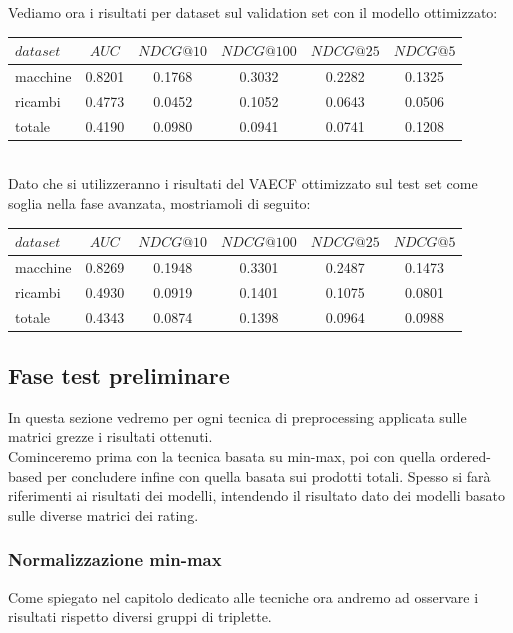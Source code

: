 Vediamo ora i risultati per dataset sul validation set con il modello ottimizzato:\\

\begin{tabular}{|l|c|cccc|}
    \toprule
    $dataset$ &    $AUC$ &  $NDCG@10$ & $NDCG@100$  & $NDCG@25$ & $NDCG@5$  \\
    \midrule
    macchine & 0.8201 & 0.1768 & 0.3032 & 0.2282 & 0.1325 \\
    ricambi & 0.4773 & 0.0452 & 0.1052 & 0.0643 & 0.0506 \\
    totale  & 0.4190 & 0.0980 & 0.0941 & 0.0741 & 0.1208 \\
\bottomrule
\end{tabular}\\

Dato che si utilizzeranno i risultati del VAECF ottimizzato sul test set come soglia nella fase avanzata, mostriamoli di seguito:\\

\begin{tabular}{|l|c|cccc|}
    \toprule
    $dataset$ &    $AUC$ &  $NDCG@10$ & $NDCG@100$  & $NDCG@25$ & $NDCG@5$  \\
    \midrule
    macchine & 0.8269 &  0.1948 &   0.3301 &  0.2487 & 0.1473 \\
    ricambi  & 0.4930 &  0.0919 &   0.1401 &  0.1075 & 0.0801 \\
    totale  & 0.4343 &  0.0874 &   0.1398 &  0.0964 & 0.0988 \\

\bottomrule
\end{tabular}

\subsection{Fase test preliminare}
In questa sezione vedremo per ogni tecnica di preprocessing applicata sulle matrici grezze i risultati ottenuti.\\
Cominceremo prima con la tecnica basata su min-max, poi con quella ordered-based per concludere infine con quella basata sui prodotti totali. 
Spesso si farà riferimenti ai risultati dei modelli, intendendo il risultato dato dei modelli basato sulle diverse matrici dei rating.


\subsubsection{Normalizzazione min-max}
Come spiegato nel capitolo dedicato alle tecniche ora andremo ad osservare i risultati rispetto diversi gruppi di triplette.\\

